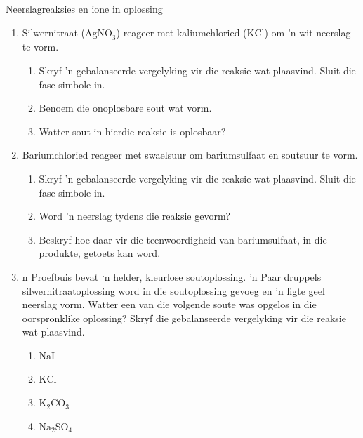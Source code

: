 {{\label{m38719*secfhsst!!!underscore!!!id1016}
            \begin{exercises}{Neerslagreaksies en ione in oplossing }
            \nopagebreak
            \label{m38719*id341939}\begin{enumerate}[noitemsep, label=\textbf{\arabic*}. ] 
            \label{m38719*uid74}\item Silwernitraat (${\text{AgNO}}_{3}$) reageer met kaliumchloried ($\text{KCl}$) om 'n wit neerslag te vorm.
\label{m38719*id341969}\begin{enumerate}[noitemsep, label=\textbf{\alph*}. ] 
            \label{m38719*uid75}\item Skryf 'n gebalanseerde vergelyking vir die reaksie wat plaasvind. Sluit die fase simbole in. 
\label{m38719*uid76}\item Benoem die onoplosbare sout wat vorm.
\label{m38719*uid77}\item Watter sout in hierdie reaksie is oplosbaar?
\end{enumerate}
\label{m38719*uid78}\item Bariumchloried reageer met swaelsuur om bariumsulfaat en soutsuur te vorm. 
\label{m38719*id342022}\begin{enumerate}[noitemsep, label=\textbf{\alph*}. ] 
            \label{m38719*uid79}\item Skryf 'n gebalanseerde vergelyking vir die reaksie wat plaasvind. Sluit die fase simbole in.
\label{m38719*uid80}\item Word 'n neerslag tydens die reaksie gevorm?
\label{m38719*uid81}\item Beskryf hoe daar vir die teenwoordigheid van bariumsulfaat, in die produkte, getoets kan word. 
\end{enumerate}
\label{m38719*uid82}\item n Proefbuis bevat ‘n helder, kleurlose soutoplossing.  'n Paar druppels silwernitraatoplossing word in die soutoplossing gevoeg en 'n ligte geel neerslag vorm. Watter een van die volgende soute was opgelos in die oorspronklike oplossing? Skryf die gebalanseerde 	vergelyking vir die reaksie wat plaasvind.
\label{m38719*id342078}\begin{enumerate}[noitemsep, label=\textbf{\alph*}. ] 
            \label{m38719*uid83}\item $\text{NaI}$
\label{m38719*uid84}\item $\text{KCl}$
\label{m38719*uid85}\item ${\text{K}}_{2}{\text{CO}}_{3}$\label{m38719*uid86}\item ${\text{Na}}_{2}{\text{SO}}_{4}$\end{enumerate}

\end{enumerate}
\end{exercises}}}
